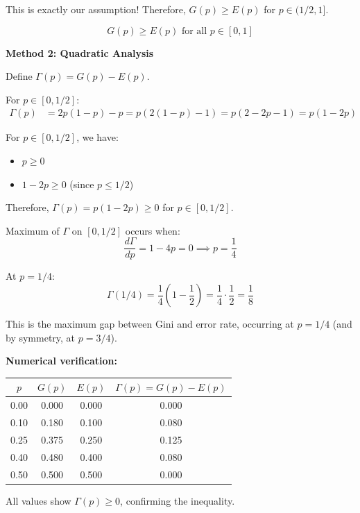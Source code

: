 \documentclass[12pt]{article}
\begin{document}
\begin{solution}
This is exactly our assumption! Therefore, $G(p) \geq E(p)$ for $p \in (1/2, 1]$.

\[
\boxed{G(p) \geq E(p) \text{ for all } p \in [0,1]}
\]

\textbf{Method 2: Quadratic Analysis}

Define $\Gamma(p) = G(p) - E(p)$.

For $p \in [0, 1/2]$:
\begin{align*}
\Gamma(p) &= 2p(1-p) - p = p(2(1-p) - 1) = p(2 - 2p - 1) = p(1 - 2p)
\end{align*}

For $p \in [0, 1/2]$, we have:
\begin{itemize}
\item $p \geq 0$
\item $1 - 2p \geq 0$ (since $p \leq 1/2$)
\end{itemize}

Therefore, $\Gamma(p) = p(1-2p) \geq 0$ for $p \in [0, 1/2]$.

Maximum of $\Gamma$ on $[0, 1/2]$ occurs when:
\[
\frac{d\Gamma}{dp} = 1 - 4p = 0 \implies p = \frac{1}{4}
\]

At $p = 1/4$:
\[
\Gamma(1/4) = \frac{1}{4}\left(1 - \frac{1}{2}\right) = \frac{1}{4} \cdot \frac{1}{2} = \frac{1}{8}
\]

This is the maximum gap between Gini and error rate, occurring at $p = 1/4$ (and by symmetry, at $p = 3/4$).

\textbf{Numerical verification:}

\begin{center}
\begin{tabular}{c|c|c|c}
$p$ & $G(p)$ & $E(p)$ & $\Gamma(p) = G(p) - E(p)$ \\
\hline
0.00 & 0.000 & 0.000 & 0.000 \\
0.10 & 0.180 & 0.100 & 0.080 \\
0.25 & 0.375 & 0.250 & 0.125 \\
0.40 & 0.480 & 0.400 & 0.080 \\
0.50 & 0.500 & 0.500 & 0.000 \\
\end{tabular}
\end{center}

All values show $\Gamma(p) \geq 0$, confirming the inequality.
\end{solution}
\end{document}

